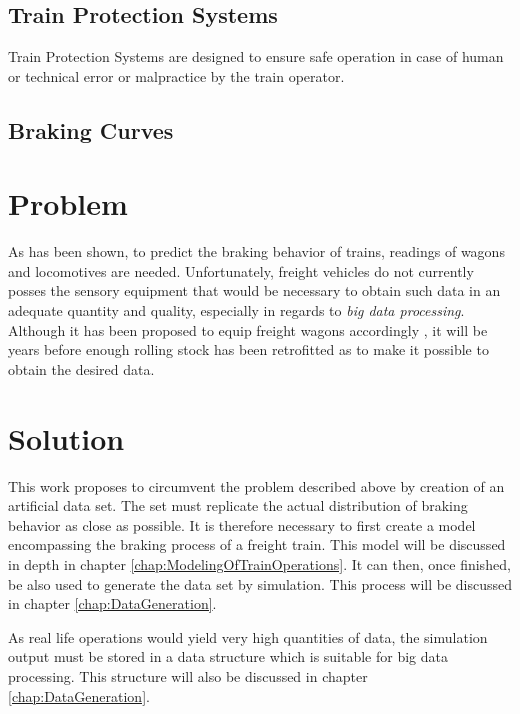 \subsection{Train Protection Systems}
\label{sec:TrainProtectionSystems}
\par\noindent
Train Protection Systems are designed to ensure safe operation in case of human or technical error or malpractice by the train operator. 

\subsection{Braking Curves}
\label{sec:BrakingCurves}

\section{Problem}
\label{sec:Problem}

\par\noindent
As has been shown, to predict the braking behavior of trains, readings of wagons and locomotives are needed. Unfortunately, freight vehicles do not currently posses the sensory equipment that would be necessary to obtain such data in an adequate quantity and quality, especially in regards to \emph{big data processing}. Although it has been proposed to equip freight wagons accordingly , it will be years before enough rolling stock has been retrofitted as to make it possible to obtain the desired data.

\section{Solution}
\label{sec:Solution}

\par\noindent
This work proposes to circumvent the problem described above by creation of an artificial data set. The set must replicate the actual distribution of braking behavior as close as possible. It is therefore necessary to first create a model encompassing the braking process of a freight train. This model will be discussed in depth in chapter \ref{chap:ModelingOfTrainOperations}. It can then, once finished, be also used to generate the data set by simulation. This process will be discussed in chapter \ref{chap:DataGeneration}.
\par
As real life operations would yield very high quantities of data, the simulation output must be stored in a data structure which is suitable for big data processing. This structure will also be discussed in chapter \ref{chap:DataGeneration}.